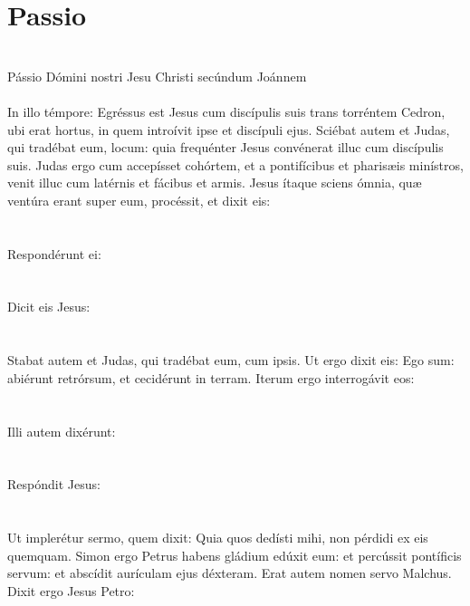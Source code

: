\documentclass[12pt, a4paper]{article}
\begin{document}
	\section*{Passio}
	
	\\
	Pássio Dómini nostri Jesu Christi secúndum Joánnem
	\\\\
	In illo témpore: Egréssus est Jesus cum discípulis suis trans torréntem Cedron, ubi erat hortus, in quem introívit ipse et discípuli ejus. Sciébat autem et Judas, qui tradébat eum, locum: quia frequénter Jesus convénerat illuc cum discípulis suis. Judas ergo cum accepísset cohórtem, et a pontifícibus et pharisæis minístros, venit illuc cum latérnis et fácibus et armis. Jesus ítaque sciens ómnia, quæ ventúra erant super eum, procéssit, et dixit eis:
	\\\\
	\\
	Respondérunt ei:
	\\\\
	\\
	Dicit eis Jesus:
	\\\\
	\\
	Stabat autem et Judas, qui tradébat eum, cum ipsis. Ut ergo dixit eis: Ego sum: abiérunt retrórsum, et cecidérunt in terram. Iterum ergo interrogávit eos:
	\\\\
	\\
	Illi autem dixérunt:
	\\\\
	\\
	Respóndit Jesus:
	\\\\
	\\
	Ut implerétur sermo, quem dixit: Quia quos dedísti mihi, non pérdidi ex eis quemquam. Simon ergo Petrus habens gládium edúxit eum: et percússit pontíficis servum: et abscídit aurículam ejus déxteram. Erat autem nomen servo Malchus. Dixit ergo Jesus Petro:
	\\\\
\end{document}
